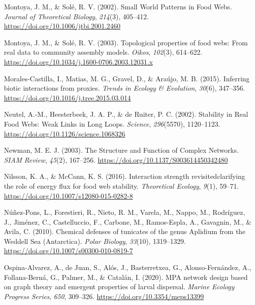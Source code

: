 \documentclass[preprint, 3p,
authoryear]{elsarticle} %
\newlength{\cslhangindent}
\newlength{\cslentryspacingunit} %
\newenvironment{CSLReferences}[2] %
 {%
  \setlength{\parindent}{0pt}
  \ifodd #1
  \let\oldpar\par
  \def\par{\hangindent=\cslhangindent\oldpar}
  \fi
  \setlength{\parskip}{#2\cslentryspacingunit}
 }%
 {}
\begin{document}
\begin{CSLReferences}{1}{0}
\leavevmode{}%
Montoya, J. M., \& Solé, R. V. (2002). Small {World Patterns} in {Food
Webs}. \emph{Journal of Theoretical Biology}, \emph{214}(3), 405--412.
\url{https://doi.org/10.1006/jtbi.2001.2460}

\leavevmode{}%
Montoya, J. M., \& Solé, R. V. (2003). Topological properties of food
webs: From real data to community assembly models. \emph{Oikos},
\emph{102}(3), 614--622.
\url{https://doi.org/10.1034/j.1600-0706.2003.12031.x}

\leavevmode{}%
Morales-Castilla, I., Matias, M. G., Gravel, D., \& Araújo, M. B.
(2015). Inferring biotic interactions from proxies. \emph{Trends in
Ecology \& Evolution}, \emph{30}(6), 347--356.
\url{https://doi.org/10.1016/j.tree.2015.03.014}

\leavevmode{}%
Neutel, A.-M., Heesterbeek, J. A. P., \& de Ruiter, P. C. (2002).
Stability in {Real Food Webs}: {Weak Links} in {Long Loops}.
\emph{Science}, \emph{296}(5570), 1120--1123.
\url{https://doi.org/10.1126/science.1068326}

\leavevmode{}%
Newman, M. E. J. (2003). The {Structure} and {Function} of {Complex
Networks}. \emph{SIAM Review}, \emph{45}(2), 167--256.
\url{https://doi.org/10.1137/S003614450342480}

\leavevmode{}%
Nilsson, K. A., \& McCann, K. S. (2016). Interaction strength
revisited\textemdash clarifying the role of energy flux for food web
stability. \emph{Theoretical Ecology}, \emph{9}(1), 59--71.
\url{https://doi.org/10.1007/s12080-015-0282-8}

\leavevmode{}%
Núñez-Pons, L., Forestieri, R., Nieto, R. M., Varela, M., Nappo, M.,
Rodríguez, J., Jiménez, C., Castelluccio, F., Carbone, M., Ramos-Espla,
A., Gavagnin, M., \& Avila, C. (2010). Chemical defenses of tunicates of
the genus {Aplidium} from the {Weddell Sea} ({Antarctica}). \emph{Polar
Biology}, \emph{33}(10), 1319--1329.
\url{https://doi.org/10.1007/s00300-010-0819-7}

\leavevmode{}%
Ospina-Alvarez, A., de Juan, S., Alós, J., Basterretxea, G.,
Alonso-Fernández, A., Follana-Berná, G., Palmer, M., \& Catalán, I.
(2020). {MPA} network design based on graph theory and emergent
properties of larval dispersal. \emph{Marine Ecology Progress Series},
\emph{650}, 309--326. \url{https://doi.org/10.3354/meps13399}


\end{CSLReferences}
\end{document}
